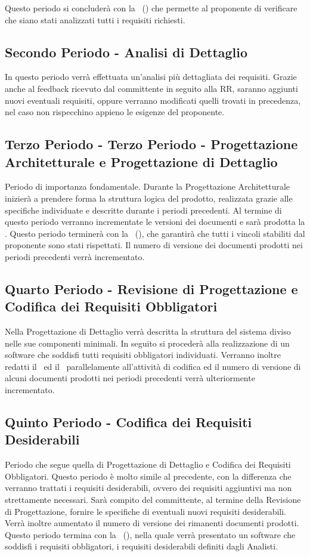 \documentclass[../PianoDiProgetto_v3.0.0.tex]{subfiles}
\begin{document}
	Questo periodo si concluderà con la \revisionedeirequisiti\ () che permette al proponente di verificare che siano stati analizzati tutti i requisiti richiesti.
			
	\subsection{Secondo Periodo - Analisi di Dettaglio}
	In questo periodo verrà effettuata un'analisi più dettagliata dei requisiti. Grazie anche al feedback ricevuto dal committente in seguito alla RR, saranno aggiunti nuovi eventuali requisiti, oppure verranno modificati quelli trovati in precedenza, nel caso non rispecchino appieno le esigenze del proponente.
		
	\subsection{Terzo Periodo - Terzo Periodo - Progettazione Architetturale e Progettazione di Dettaglio}
	Periodo di importanza fondamentale. Durante la Progettazione Architetturale inizierà a prendere forma la struttura logica del prodotto, realizzata grazie alle specifiche individuate e descritte durante i periodi precedenti. Al termine di questo periodo verranno incrementate le versioni dei documenti e sarà prodotta la . Questo periodo terminerà con la \revisionediprogettazione\ (), che garantirà che tutti i vincoli stabiliti dal proponente sono stati rispettati. Il numero di versione dei documenti prodotti nei periodi precedenti verrà incrementato.
		
	\subsection{Quarto Periodo - Revisione di Progettazione e Codifica dei Requisiti Obbligatori}
	Nella Progettazione di Dettaglio verrà descritta la struttura del sistema diviso nelle sue componenti minimali. In seguito si procederà alla realizzazione di un software che soddisfi tutti requisiti obbligatori individuati. Verranno inoltre redatti il \manualeutente\ ed il \manualesviluppatore\ parallelamente all'attività di codifica ed il numero di versione di alcuni documenti prodotti nei periodi precedenti verrà ulteriormente incrementato.
		
	\subsection{Quinto Periodo - Codifica dei Requisiti Desiderabili}
	Periodo che segue quella di Progettazione di Dettaglio e Codifica dei Requisiti Obbligatori. Questo periodo è molto simile al precedente, con la differenza che verranno trattati i requisiti desiderabili, ovvero dei requisiti aggiuntivi ma non strettamente necessari. Sarà compito del committente, al termine della Revisione di Progettazione, fornire le specifiche di eventuali nuovi requisiti desiderabili. Verrà inoltre aumentato il numero di versione dei rimanenti documenti prodotti. Questo periodo termina con la \revisionediqualifica\ (), nella quale verrà presentato un software che soddisfi i requisiti obbligatori, i requisiti desiderabili definiti dagli Analisti.
		
\end{document}
